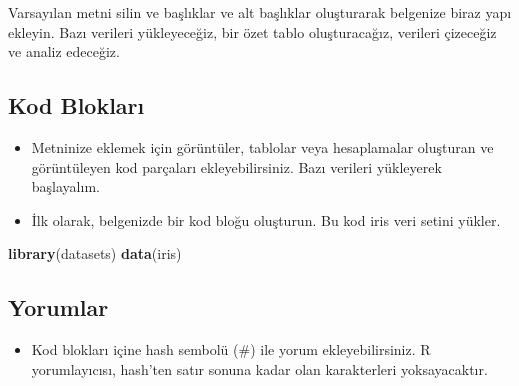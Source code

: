 \documentclass[
  oneside]{book}
\newenvironment{Shaded}{\begin{snugshade}}{\end{snugshade}}
\newcommand{\CommentTok}[1]{\textcolor[rgb]{0.56,0.35,0.01}{\textit{#1}}}
\newcommand{\FunctionTok}[1]{\textcolor[rgb]{0.13,0.29,0.53}{\textbf{#1}}}
\newcommand{\NormalTok}[1]{#1}
\newcommand{\OtherTok}[1]{\textcolor[rgb]{0.56,0.35,0.01}{#1}}
\newcommand{\SpecialCharTok}[1]{\textcolor[rgb]{0.81,0.36,0.00}{\textbf{#1}}}
\providecommand{\tightlist}{%
  \setlength{\itemsep}{0pt}\setlength{\parskip}{0pt}}
\begin{document}
\begin{try}
Varsayılan metni silin ve başlıklar ve alt başlıklar oluşturarak belgenize biraz yapı ekleyin. Bazı verileri yükleyeceğiz, bir özet tablo oluşturacağız, verileri çizeceğiz ve analiz edeceğiz.

\end{try}

\hypertarget{kod-bloklarux131}{%
\subsection{Kod Blokları}\label{kod-bloklarux131}}

\begin{itemize}
\item
  Metninize eklemek için görüntüler, tablolar veya hesaplamalar oluşturan ve görüntüleyen kod parçaları ekleyebilirsiniz. Bazı verileri yükleyerek başlayalım.
\item
  İlk olarak, belgenizde bir kod bloğu oluşturun. Bu kod iris veri setini yükler.
\end{itemize}

\begin{Shaded}
\begin{Highlighting}[]
\FunctionTok{library}\NormalTok{(datasets)}
\FunctionTok{data}\NormalTok{(iris)}
\end{Highlighting}
\end{Shaded}

\hypertarget{yorumlar}{%
\subsection{Yorumlar}\label{yorumlar}}

\begin{itemize}
\tightlist
\item
  Kod blokları içine hash sembolü (\#) ile yorum ekleyebilirsiniz. R yorumlayıcısı, hash'ten satır sonuna kadar olan karakterleri yoksayacaktır.
\end{itemize}

\begin{Shaded}
\end{Shaded}
\end{document}
